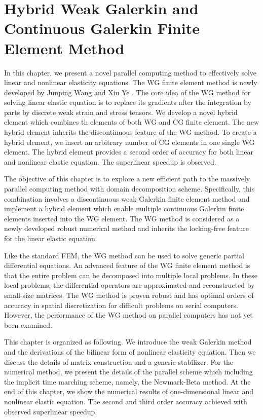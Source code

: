 \chapter{Hybrid Weak Galerkin and Continuous Galerkin Finite Element Method}
\label{chapter3}

In this chapter, we present a novel parallel computing method to effectively solve linear and nonlinear elasticity equations. The WG finite element method is newly developed by Junping Wang and Xiu Ye \cite{wang2013weak}. The core idea of the WG method for solving linear elastic equation is to replace its gradients after the integration by parts by discrete weak strain and stress tensors. We develop a novel hybrid element which combines th elements of both WG and CG finite element. The new hybrid element inherits the discontinuous feature of the WG method. To create a hybrid element, we insert an arbitrary number of CG elements in one single WG element. The hybrid element provides a second order of accuracy for both linear and nonlinear elastic equation. The superlinear speedup is observed.

The objective of this chapter is to explore a new efficient path to the massively parallel computing method with domain decomposition scheme. Specifically, this combination involves a discontinuous weak Galerkin finite element method\cite{wang2013weak, li2013weak, wang2014weak} and implement a hybrid element which enable multiple continuous Galerkin finite elements inserted into the WG element. The WG method is considered as a newly developed robust numerical method and inherits the locking-free feature for the linear elastic equation\cite{wang2016locking}.

Like the standard FEM, the WG method can be used to solve generic partial differential equations. An advanced feature of the WG finite element method is that the entire problem can be decomposed into multiple local problems. In these local problems, the differential operators are approximated and reconstructed by small-size matrices. The WG method is proven robust and has optimal orders of accuracy in spatial discretization for difficult problems on serial computers. However, the performance of the WG method on parallel computers has not yet been examined.

This chapter is organized as following. We introduce the weak Galerkin method and the derivations of the bilinear form of nonlinear elasticity equation. Then we discuss the details of matrix construction and a generic stabilizer. For the numerical method, we present the details of the parallel scheme which including the implicit time marching scheme, namely, the Newmark-Beta method\cite{adeli1978algorithms}. At the end of this chapter, we show the numerical results of one-dimensional linear and nonlinear elastic equation. The second and third order accuracy achieved with observed superlinear speedup.

